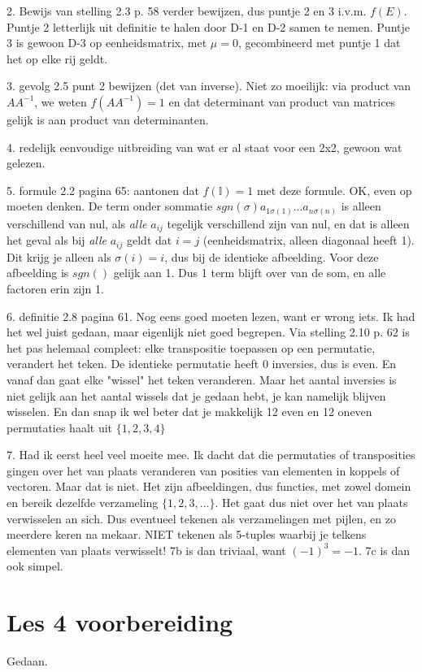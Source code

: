\documentclass{article}
\begin{document}
2. Bewijs van stelling 2.3 p. 58 verder bewijzen, dus puntje 2 en 3 i.v.m. $f(E)$. Puntje 2 letterlijk uit definitie te halen door D-1 en D-2 samen te nemen. Puntje 3 is gewoon D-3 op eenheidsmatrix, met $\mu=0$, gecombineerd met puntje 1 dat het op elke rij geldt.  

3. gevolg 2.5 punt 2 bewijzen (det van inverse). Niet zo moeilijk: via product van $AA^{-1}$, we weten $f( AA^{-1}) = 1$ en dat determinant van product van matrices gelijk is aan product van determinanten. 

4. redelijk eenvoudige uitbreiding van wat er al staat voor een 2x2, gewoon wat gelezen. 

5. formule 2.2 pagina 65: aantonen dat $f(\mathbb{I})=1$ met deze formule. OK, even op moeten denken. De term onder sommatie $sgn(\sigma)a_{1\sigma(1)}...a_{n\sigma(n)}$ is alleen verschillend van nul, als \emph{alle} $a_{ij}$ tegelijk verschillend zijn van nul, en dat is alleen het geval als bij \emph{alle} $a_{ij}$ geldt dat $i=j$ (eenheidsmatrix, alleen diagonaal heeft 1). Dit krijg je alleen als $\sigma(i)=i$, dus bij de identieke afbeelding. Voor deze afbeelding is $sgn()$ gelijk aan 1. Dus 1 term blijft over van de som, en alle factoren erin zijn 1. 

6. definitie 2.8 pagina 61. Nog eens goed moeten lezen, want er wrong iets. Ik had het wel juist gedaan, maar eigenlijk niet goed begrepen. Via stelling 2.10 p. 62 is het pas helemaal compleet: elke transpositie toepassen op een permutatie, verandert het teken. De identieke permutatie heeft 0 inversies, dus is even. En vanaf dan gaat elke "wissel" het teken veranderen. Maar het aantal inversies is niet gelijk aan het aantal wissels dat je gedaan hebt, je kan namelijk blijven wisselen. En dan snap ik wel beter dat je makkelijk 12 even en 12 oneven permutaties haalt uit $\{1,2,3,4\}$

7. Had ik eerst heel veel moeite mee. Ik dacht dat die permutaties of transposities gingen over het van plaats veranderen van posities van elementen in koppels of vectoren. Maar dat is niet. Het zijn afbeeldingen, dus functies, met zowel domein en bereik dezelfde verzameling $\{1,2,3,...\}$. Het gaat dus niet over het van plaats verwisselen an sich. Dus eventueel tekenen als verzamelingen met pijlen, en zo meerdere keren na mekaar. NIET tekenen als 5-tuples waarbij je telkens elementen van plaats verwisselt! 
7b is dan triviaal, want $(-1)^3=-1$. 7c is dan ook simpel. 


\section{Les 4 voorbereiding} 
Gedaan. 
\end{document}
